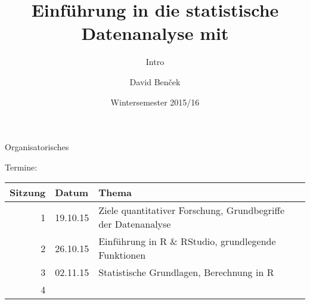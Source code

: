 \documentclass[ignorenonframetext,]{beamer}
\title{Einführung in die statistische Datenanalyse mit \R{}}
\subtitle{Intro}
\author{David Benček
}
\institute{}
\date{Wintersemester 2015/16}
\newcommand{\R}{\textsf{R}}
\begin{document}
\frame{\titlepage}

\begin{frame}{Organisatorisches}

Termine:

\begin{longtable}[c]{@{}rll@{}}
\toprule
\begin{minipage}[b]{0.18\columnwidth}\raggedleft\strut
Sitzung
\strut\end{minipage} &
\begin{minipage}[b]{0.18\columnwidth}\raggedright\strut
Datum
\strut\end{minipage} &
\begin{minipage}[b]{0.46\columnwidth}\raggedright\strut
Thema
\strut\end{minipage}\tabularnewline
\midrule
\endhead
\begin{minipage}[t]{0.18\columnwidth}\raggedleft\strut
1
\strut\end{minipage} &
\begin{minipage}[t]{0.18\columnwidth}\raggedright\strut
19.10.15
\strut\end{minipage} &
\begin{minipage}[t]{0.46\columnwidth}\raggedright\strut
Ziele quantitativer Forschung, Grundbegriffe der Datenanalyse
\strut\end{minipage}\tabularnewline
\begin{minipage}[t]{0.18\columnwidth}\raggedleft\strut
2
\strut\end{minipage} &
\begin{minipage}[t]{0.18\columnwidth}\raggedright\strut
26.10.15
\strut\end{minipage} &
\begin{minipage}[t]{0.46\columnwidth}\raggedright\strut
Einführung in \R{} \& RStudio, grundlegende Funktionen
\strut\end{minipage}\tabularnewline
\begin{minipage}[t]{0.18\columnwidth}\raggedleft\strut
3
\strut\end{minipage} &
\begin{minipage}[t]{0.18\columnwidth}\raggedright\strut
02.11.15
\strut\end{minipage} &
\begin{minipage}[t]{0.46\columnwidth}\raggedright\strut
Statistische Grundlagen, Berechnung in \R{}
\strut\end{minipage}\tabularnewline
\begin{minipage}[t]{0.18\columnwidth}\raggedleft\strut
4
\strut\end{minipage} &

\end{longtable}
\end{frame}
\end{document}
